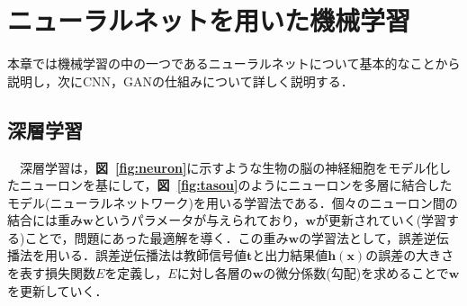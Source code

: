 \documentclass[a4j, 11pt]{jreport}
\newcommand{\figref}[1]{\textbf{図~\ref{#1}}}
\begin{document}
\chapter{ニューラルネットを用いた機械学習}
本章では機械学習の中の一つであるニューラルネットについて基本的なことから説明し，次にCNN，GANの仕組みについて詳しく説明する．

\section{深層学習}
　深層学習は，\figref{fig:neuron}に示すような生物の脳の神経細胞をモデル化したニューロンを基にして，\figref{fig:tasou}のようにニューロンを多層に結合したモデル(ニューラルネットワーク)を用いる学習法である．個々のニューロン間の結合には重み$\bm{w}$というパラメータが与えられており，$\bm{w}$が更新されていく(学習する)ことで，問題にあった最適解を導く．この重み$\bm{w}$の学習法として，誤差逆伝播法を用いる．誤差逆伝播法は教師信号値$\bm{t}$と出力結果値$\bm{h(x)}$の誤差の大きさを表す損失関数$E$を定義し，$E$に対し各層の$\bm{w}$の微分係数(勾配)を求めることで$\bm{w}$を更新していく．\\
\end{document}
